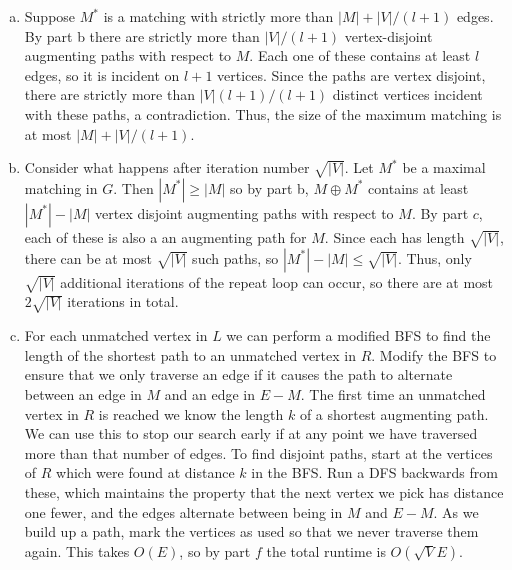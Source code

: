 \documentclass{article}
\begin{document}
\begin{enumerate}[a.]
\item Suppose $M^*$ is a matching with strictly more than $|M| + |V|/(l+1)$ edges.  By part b there are strictly more than $|V|/(l+1)$ vertex-disjoint augmenting paths with respect to $M$.  Each one of these contains at least $l$ edges, so it is incident on $l+1$ vertices.  Since the paths are vertex disjoint, there are strictly more than $|V|(l+1)/(l+1)$ distinct vertices incident with these paths, a contradiction.  Thus, the size of the maximum matching is at most $|M| + |V|/(l+1)$.

\item Consider what happens after iteration number $\sqrt{|V|}$.  Let $M^*$ be a maximal matching in $G$.  Then $|M^*| \geq |M|$ so by part b, $M\oplus M^*$ contains at least $|M^*|-|M|$ vertex disjoint augmenting paths with respect to $M$. By part $c$, each of these is also a an augmenting path for $M$. Since each has length $\sqrt{|V|}$, there can be at most $\sqrt{|V|}$ such paths, so $|M^*|-|M| \leq \sqrt{|V|}$.  Thus, only $\sqrt{|V|}$ additional iterations of the repeat loop can occur, so there are at most $2\sqrt{|V|}$ iterations in total. 

\item For each unmatched vertex in $L$ we can perform a modified BFS to find the length of the shortest path to an unmatched vertex in $R$.  Modify the BFS to ensure that we only traverse an edge if it causes the path to alternate between an edge in $M$ and an edge in $E-M$.  The first time an unmatched vertex in $R$ is reached we know the length $k$ of a shortest augmenting path.  We can use this to stop our search early if at any point we have traversed more than that number of edges. To find disjoint paths, start at the vertices of $R$ which were found at distance $k$ in the BFS.  Run a DFS backwards from these, which maintains the property that the next vertex we pick has distance one fewer, and the edges alternate between being in $M$ and $E-M$. As we build up a path, mark the vertices as used so that we never traverse them again.  This takes $O(E)$, so by part $f$ the total runtime is $O(\sqrt{V}E)$. 
\end{enumerate}
\end{document}

